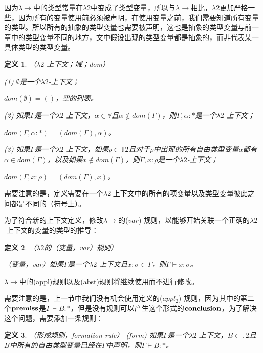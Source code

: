 \documentclass[UTF8]{article}
\newtheorem{thm}{定义}[section]
\begin{document}
		因为$\lambda{\rightarrow}$中的类型常量在$\lambda{2}$中变成了类型变量，所以与$\lambda{\rightarrow}$相比，$\lambda{2}$更加严格一些，因为所有的变量使用前必须被声明，在使用变量之前，我们需要知道所有变量的类型。所以所有的抽象的类型变量也需要被声明，这也是抽象的类型变量与前一章中的类型变量不同的地方，文中假设出现的类型变量都是抽象的，而非代表某一具体类型的类型变量。
		
		\begin{thm}（$\lambda{2}$-上下文；域；dom）
			
			(1) $\emptyset$是一个$\lambda{2}$-上下文；
			
			$dom(\emptyset) = ()$，空的列表。
			
			(2) 如果$\Gamma$是一个$\lambda{2}$-上下文，$\alpha\in\mathbb{V}$且$\alpha\notin dom(\Gamma)$，则$\Gamma,\alpha:*$是一个$\lambda{2}$-上下文；
			
			$dom(\Gamma,\alpha:*)=(dom(\Gamma),\alpha)$。
			
			(3) 如果$\Gamma$是一个$\lambda{2}$-上下文，如果$\rho\in\mathbb{T}2$且对于$\rho$中出现的所有自由类型变量$\alpha$都有$\alpha\in dom(\Gamma)$，以及如果$x\notin dom(\Gamma)$，则$\Gamma,x:\rho$是一个$\lambda{2}$-上下文；
			
			$dom(\Gamma,x:\rho)=(dom(\Gamma),x)$。
		\end{thm}
	
		需要注意的是，定义需要在一个$\lambda{2}$-上下文中的所有的项变量以及类型变量彼此之间都是不同的（符号上）。
		
		为了符合新的上下文定义，修改$\lambda{\rightarrow}$的($var$)-规则，以能够开始关联一个正确的$\lambda{2}$-上下文的变量的类型的推导：
		
		\begin{thm} （$\lambda{2}$的（变量，var）规则）
			
			（变量，var）如果$\Gamma$是一个$\lambda{2}$-上下文且$x:\sigma\in\Gamma$，则$\Gamma\vdash x:\sigma$。
		\end{thm}
	
		$\lambda{\rightarrow}$中的(appl)规则以及(abst)规则将继续使用而不进行修改。
		
		需要注意的是，上一节中我们没有机会使用定义的($appl_2$)-规则，因为其中的第二个$\bf premiss$是$\Gamma\vdash B:*$，但是没有规则可以产生这个形式的$\bf conclusion$，为了解决这个问题，需要添加一条规则：
		
		\begin{thm}（形成规则，formation rule）
			(form) 如果$\Gamma$是一个$\lambda{2}$-上下文，$B\in\mathbb{T}2$且$B$中所有的自由类型变量已经在$\Gamma$中声明，则$\Gamma\vdash B:*$。
		\end{thm}
		
\end{document}
